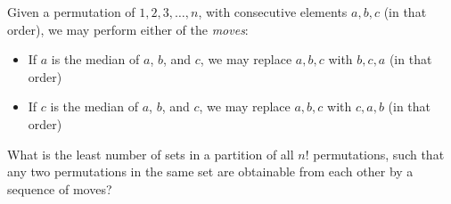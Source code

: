 Given a permutation of $1,2,3,\dots,n$, with consecutive elements $a,b,c$ (in that order), we may perform either of the \textit{moves}:
\begin{itemize}
	\item If $a$ is the median of $a$, $b$, and $c$, we may replace $a,b,c$ with $b,c,a$ (in that order)
	\item If $c$ is the median of $a$, $b$, and $c$, we may replace $a,b,c$ with $c,a,b$ (in that order)
\end{itemize}
What is the least number of sets in a partition of all $n!$ permutations, such that any two permutations in the same set are obtainable from each other by a sequence of moves?

